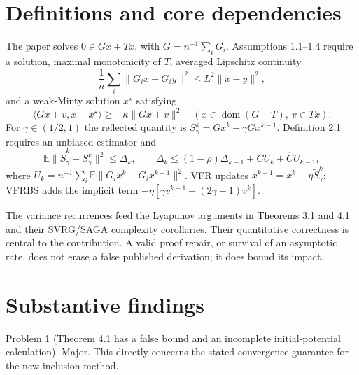 \documentclass[10pt]{article}
\begin{document}
\section*{Definitions and core dependencies}
The paper solves \(0\in Gx+Tx\), with \(G=n^{-1}\sum_iG_i\). Assumptions 1.1–1.4 require a solution, maximal monotonicity of \(T\), averaged Lipschitz continuity \[\frac1n\sum_i\|G_ix-G_iy\|^2\le L^2\|x-y\|^2,\] and a weak-Minty solution \(x^\star\) satisfying \[\langle Gx+v,x-x^\star\rangle\ge-\kappa\|Gx+v\|^2
 \quad(x\in\operatorname{dom}(G+T),\ v\in Tx).\] For \(\gamma\in(1/2,1)\) the reflected quantity is \(S_\gamma^k=Gx^k-\gamma Gx^{k-1}\). Definition 2.1 requires an unbiased estimator and \[\mathbb E\|\widetilde S_\gamma^k-S_\gamma^k\|^2\le\Delta_k,\qquad
 \Delta_k\le(1-\rho)\Delta_{k-1}+CU_k+\widehat C U_{k-1},\] where \(U_k=n^{-1}\sum_i\mathbb E\|G_ix^k-G_ix^{k-1}\|^2\). VFR updates \(x^{k+1}=x^k-\eta\widetilde S_\gamma^k\); VFRBS adds the implicit term \(-\eta[\gamma v^{k+1}-(2\gamma-1)v^k]\).\par
The variance recurrences feed the Lyapunov arguments in Theorems 3.1 and 4.1 and their SVRG/SAGA complexity corollaries. Their quantitative correctness is central to the contribution. A valid proof repair, or survival of an asymptotic rate, does not erase a false published derivation; it does bound its impact.\par
\section*{Substantive findings}
Problem 1 (Theorem 4.1 has a false bound and an incomplete initial-potential calculation).  Major. This directly concerns the stated convergence guarantee for the new inclusion method.\par
\end{document}
